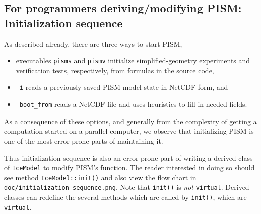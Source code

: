 \documentclass[titlepage,letterpaper,final]{scrartcl}
\begin{document}
\subsection{For programmers deriving/modifying PISM:  Initialization sequence}  As described already, there are three ways to start PISM,\begin{itemize}
\item executables \texttt{pisms} and \texttt{pismv} initialize simplified-geometry experiments and verification tests, respectively, from formulas in the source code,
\item \texttt{-i} reads a previously-saved PISM model state in NetCDF form, and
\item \texttt{-boot_from} reads a NetCDF file and uses heuristics to fill in needed fields.
\end{itemize}
As a consequence of these options, and generally from the complexity of getting a computation started on a parallel computer, we observe that initializing PISM is one of the most error-prone parts of maintaining it.

Thus initialization sequence is also an error-prone part of writing a derived class of \texttt{IceModel} to modify PISM's function.  The reader interested in doing so should see method \texttt{IceModel::init()} and also view the flow chart in \texttt{doc/initialization-sequence.png}.  Note that \texttt{init()} is \emph{not} \texttt{virtual}.  Derived classes can redefine the several methods which are called by \texttt{init()}, which are \texttt{virtual}.


\clearpage\newpage


\clearpage\newpage


\clearpage\newpage


\clearpage\newpage


\clearpage\newpage


\clearpage\newpage


\clearpage\newpage



{}
\label{sect:index}
\printindex

{}
\printindex[options]
\end{document}
